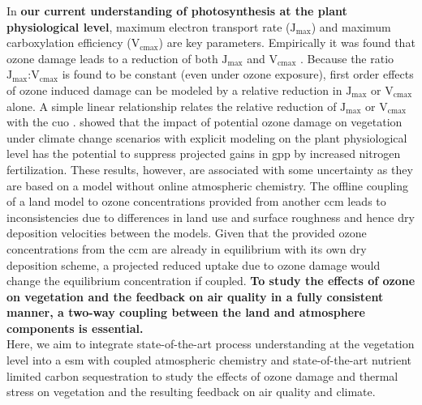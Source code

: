 In \textbf{our current understanding of photosynthesis at the plant physiological level}, maximum electron transport rate ($\mathrm{J_{max}}$) and maximum carboxylation efficiency ($\mathrm{V_{cmax}}$) are key parameters. Empirically it was found that ozone damage leads to a reduction of both $\mathrm{J_{max}}$ and $\mathrm{V_{cmax}}$ \parencite{EJA:Emberson2018}. Because the ratio $\mathrm{J_{max}}$:$\mathrm{V_{cmax}}$ is found to be constant (even under ozone exposure), first order effects of ozone induced damage can be modeled by a relative reduction in $\mathrm{J_{max}}$ or $\mathrm{V_{cmax}}$ alone. A simple linear relationship relates the relative reduction of $\mathrm{J_{max}}$ or $\mathrm{V_{cmax}}$ with the \gls{cuo} \parencites{BGS:Franz2017}{BGS:Franz2018}. \textcite{BGSD:Franz2020} showed that the impact of potential ozone damage on vegetation under climate change scenarios with explicit modeling on the plant physiological level has the potential to suppress projected gains in \gls{gpp} by increased nitrogen fertilization. These results, however, are associated with some uncertainty as they are based on a model without online atmospheric chemistry. The offline coupling of a land model to ozone concentrations provided from another \gls{ccm} leads to inconsistencies due to differences in land use and surface roughness and hence dry deposition velocities between the models. Given that the provided ozone concentrations from the \gls{ccm} are already in equilibrium with its own dry deposition scheme, a projected reduced uptake due to ozone damage would change the equilibrium concentration if coupled. \textbf{To study the effects of ozone on vegetation and the feedback on air quality in a fully consistent manner, a two-way coupling between the land and atmosphere components is essential.}\\

Here, we aim to integrate state-of-the-art process understanding at the vegetation level into a \gls{esm} with coupled atmospheric chemistry and state-of-the-art nutrient limited carbon sequestration to study the effects of ozone damage and thermal stress on vegetation and the resulting feedback on air quality and climate.

